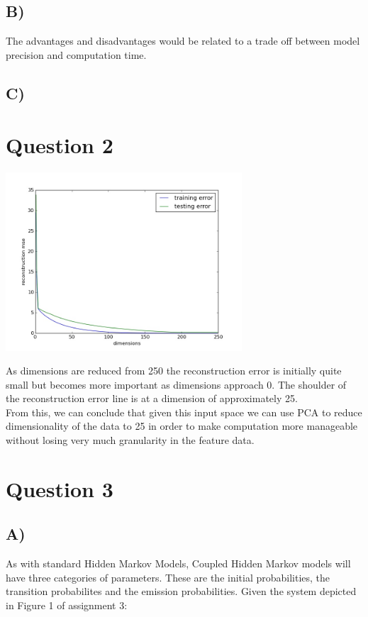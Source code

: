 \documentclass{report}
\begin{document}
\subsection*{B)}
The advantages and disadvantages would be related to a trade off between
model precision and computation time.
\subsection*{C)}

\section*{Question 2}
\begin{center}
\includegraphics[width=250pt, keepaspectratio=true]{reconstruction_error.jpg}\\
\end{center}
As dimensions are reduced from 250 the reconstruction error is initially quite
small but becomes more important as dimensions approach 0. The
shoulder of the reconstruction error line is at a dimension of approximately 25.\\

From this, we can conclude that given this input space we can use PCA to
reduce dimensionality of the data to 25 in order to make computation more manageable
without losing very much granularity in the feature data.
\section*{Question 3}
\subsection*{A)}
As with standard Hidden Markov Models, Coupled Hidden Markov models will
have three categories of parameters. These are the initial probabilities, the
transition probabilites and the emission probabilities. Given the system
depicted in Figure 1 of assignment 3:\\
\end{document}
